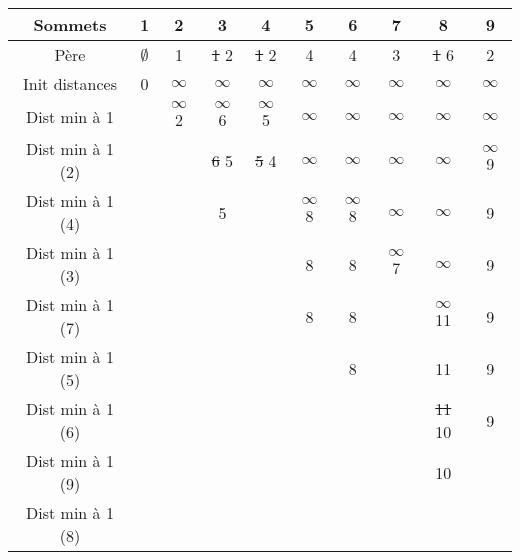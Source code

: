 \documentclass{article}
\begin{document}
\begin{center}
\begin{tabular}{|c|c|c|c|c|c|c|c|c|c|}
\hline
    Sommets & 1 & 2 & 3 & 4 & 5 & 6 & 7 & 8 & 9 \\
\hline
    Père & $\emptyset$ & 1 & \st{1} 2 & \st{1} 2 & 4 & 4 & 3 & \st{1} 6 & 2 \\
\hline
    Init distances & {\color{red}0} & $\infty$ & $\infty$ & $\infty$ & $\infty$ & $\infty$ & $\infty$ & $\infty$ & $\infty$ \\
\hline
    Dist min à 1 & \cellcolor{black} & \st{$\infty$} {\color{red}2} & \st{$\infty$} 6 & \st{$\infty$} 5 & $\infty$ & $\infty$ & $\infty$ & $\infty$ & $\infty$ \\
\hline      
    Dist min à 1 (2) & \cellcolor{black} & \cellcolor{black} & \st{6} 5 & \st{5} {\color{red}4} & $\infty$ & $\infty$ & $\infty$ & $\infty$ & \st{$\infty$} 9 \\
\hline      
    Dist min à 1 (4) & \cellcolor{black} & \cellcolor{black} & {\color{red}5} & \cellcolor{black} & \st{$\infty$} 8 & \st{$\infty$} 8 & $\infty$ & $\infty$ & 9 \\
\hline      
    Dist min à 1 (3) & \cellcolor{black} & \cellcolor{black} & \cellcolor{black} & \cellcolor{black} & 8 & 8 & \st{$\infty$} {\color{red}7} & $\infty$ & 9 \\
\hline      
    Dist min à 1 (7) & \cellcolor{black} & \cellcolor{black} & \cellcolor{black} & \cellcolor{black} & {\color{red}8} & 8 & \cellcolor{black} & \st{$\infty$} 11 & 9 \\
\hline      
    Dist min à 1 (5) & \cellcolor{black} & \cellcolor{black} & \cellcolor{black} & \cellcolor{black} & \cellcolor{black} & {\color{red}8} & \cellcolor{black} & 11 & 9 \\
\hline      
    Dist min à 1 (6) & \cellcolor{black} & \cellcolor{black} & \cellcolor{black} & \cellcolor{black} & \cellcolor{black} & \cellcolor{black} & \cellcolor{black} & \st{11} 10 & {\color{red}9} \\
\hline      
    Dist min à 1 (9) & \cellcolor{black} & \cellcolor{black} & \cellcolor{black} & \cellcolor{black} & \cellcolor{black} & \cellcolor{black} & \cellcolor{black} & {\color{red}10} & \cellcolor{black} \\
\hline      
    Dist min à 1 (8) & \cellcolor{black} & \cellcolor{black} & \cellcolor{black} & \cellcolor{black} & \cellcolor{black} & \cellcolor{black} & \cellcolor{black} & \cellcolor{black} & \cellcolor{black} \\
\hline
\end{tabular}
\end{center}
\newpage
\end{document}
